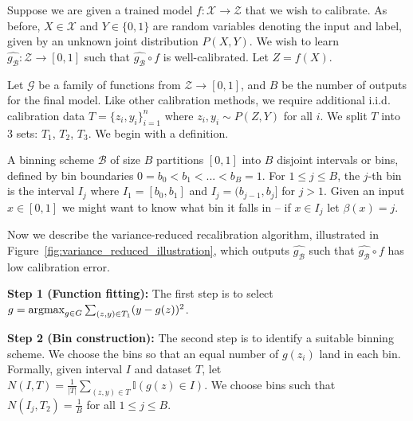 Suppose we are given a trained model $f: \mathcal{X} \to \mathcal{Z}$ that we wish to calibrate. As before, $X \in \mathcal{X}$ and $Y \in \{0, 1\}$ are random variables denoting the input and label, given by an unknown joint distribution $P(X, Y)$.  We wish to learn $\hat{g_{\mathcal{B}}} : \mathcal{Z} \to [0, 1]$ such that $\hat{g_{\mathcal{B}}} \circ f$ is well-calibrated.  Let $Z = f(X)$.

Let $\mathcal{G}$ be a family of functions from $\mathcal{Z} \to [0, 1]$, and $B$ be the number of outputs  for the final model. Like other calibration methods, we require additional i.i.d. calibration data $T = \{ z_i, y_i \}_{i=1}^n$ where $z_i, y_i \sim P(Z, Y)$ for all $i$. We split $T$ into 3 sets: $T_1$, $T_2$, $T_3$. We begin with a definition.

\begin{definition}
A binning scheme $\mathcal{B}$ of size $B$ partitions $[0, 1]$ into $B$ disjoint intervals or bins, defined by bin boundaries $0 = b_0 < b_1 < ... < b_B = 1$. For $1 \leq j \leq B$, the $j$-th bin is the interval $I_j$ where $I_1 = [b_0, b_1]$ and $I_j = (b_{j-1}, b_j]$ for $j > 1$. Given an input $x \in [0, 1]$ we might want to know what bin it falls in -- if $x \in I_j$ let $\beta(x) = j$.
\end{definition}

Now we describe the variance-reduced recalibration algorithm, illustrated in Figure~\ref{fig:variance_reduced_illustration}, which outputs $\hat{g_{\mathcal{B}}}$ such that $\hat{g_{\mathcal{B}}} \circ f$ has low calibration error.


\textbf{Step 1 (Function fitting):} The first step is to select $g = \mathop{\mbox{argmax}}_{g \in G} \sum_{(z, y) \in T_1} (y - g(z))^2$.

\textbf{Step 2 (Bin construction):} The second step is to identify a suitable binning scheme. We choose the bins so that an equal number of $g(z_i)$ land in each bin. Formally, given interval $I$ and dataset $T$, let $N(I, T) = \frac{1}{|T|}\sum_{(z, y) \in T} \mathbb{I}(g(z) \in I)$. We choose bins such that  $N(I_j, T_2) = \frac{1}{B}$ for all $1 \leq j \leq B$. 


